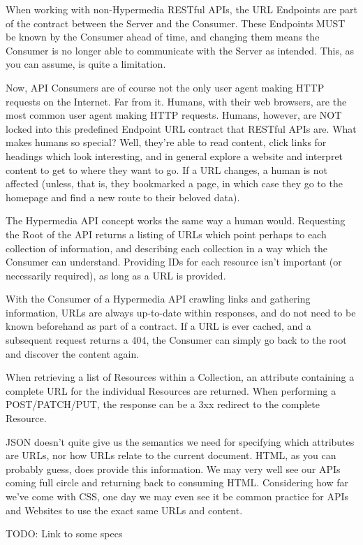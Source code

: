 \documentclass{book}
\begin{document}
When working with non-Hypermedia RESTful APIs, the URL Endpoints are part of the contract between the Server and the Consumer. These Endpoints MUST be known by the Consumer ahead of time, and changing them means the Consumer is no longer able to communicate with the Server as intended. This, as you can assume, is quite a limitation.

Now, API Consumers are of course not the only user agent making HTTP requests on the Internet. Far from it. Humans, with their web browsers, are the most common user agent making HTTP requests. Humans, however, are NOT locked into this predefined Endpoint URL contract that RESTful APIs are. What makes humans so special? Well, they're able to read content, click links for headings which look interesting, and in general explore a website and interpret content to get to where they want to go. If a URL changes, a human is not affected (unless, that is, they bookmarked a page, in which case they go to the homepage and find a new route to their beloved data).

The Hypermedia API concept works the same way a human would. Requesting the Root of the API returns a listing of URLs which point perhaps to each collection of information, and describing each collection in a way which the Consumer can understand. Providing IDs for each resource isn't important (or necessarily required), as long as a URL is provided.

With the Consumer of a Hypermedia API crawling links and gathering information, URLs are always up-to-date within responses, and do not need to be known beforehand as part of a contract. If a URL is ever cached, and a subsequent request returns a 404, the Consumer can simply go back to the root and discover the content again.

When retrieving a list of Resources within a Collection, an attribute containing a complete URL for the individual Resources are returned. When performing a POST/PATCH/PUT, the response can be a 3xx redirect to the complete Resource.

JSON doesn't quite give us the semantics we need for specifying which attributes are URLs, nor how URLs relate to the current document. HTML, as you can probably guess, does provide this information. We may very well see our APIs coming full circle and returning back to consuming HTML. Considering how far we've come with CSS, one day we may even see  it be common practice for APIs and Websites to use the exact same URLs and content.

TODO: Link to some specs
\end{document}

